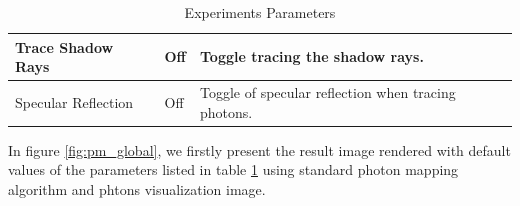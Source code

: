 \begin{table}[ht]
\begin{center}
\begin{tabular}{p{5cm}p{3cm}p{5cm}}
	\hline 
	
	Trace Shadow Rays			&		Off					& 		Toggle tracing the shadow rays. \\

	\hline

	Specular Reflection		&		Off					&		Toggle of specular reflection when tracing photons. \\

	\hline
	
	\end{tabular}
\end{center} 
\caption{Experiments Parameters}
\label{tab:expr_params}
\end{table}

In figure \ref{fig:pm_global}, we firstly present the result image rendered with default values of the parameters listed in table \ref{tab:expr_params} using standard photon mapping algorithm and phtons visualization image. 

